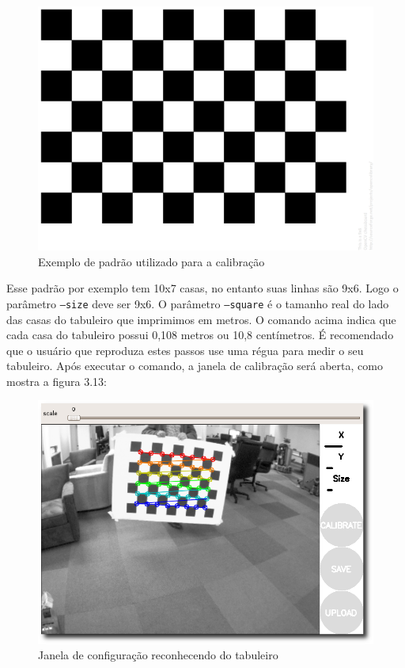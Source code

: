 \begin{figure}[H]
	\centering
		\includegraphics[width= \textwidth]{Imagens/figura3-3E3-12.png}
	\caption{Exemplo de padrão utilizado para a calibração}
	\label{fig3:12}
\end{figure}


Esse padrão por exemplo tem 10x7 casas, no entanto suas linhas são 9x6. Logo o parâmetro \texttt{--size} deve ser 9x6.
O parâmetro \texttt{--square} é o tamanho real do lado das casas do tabuleiro que imprimimos em metros. O comando acima indica que cada casa do tabuleiro possui 0,108 metros ou 10,8 centímetros. É recomendado que o usuário que reproduza estes passos use uma régua para medir o seu tabuleiro.
Após executar o comando, a janela de calibração será aberta, como mostra a figura 3.13:

\begin{figure}[H]
	\centering
		\includegraphics[width= \textwidth]{Imagens/figura3-13.png}
	\caption{Janela de configuração reconhecendo do tabuleiro}
	\label{fig3:13}
\end{figure}

